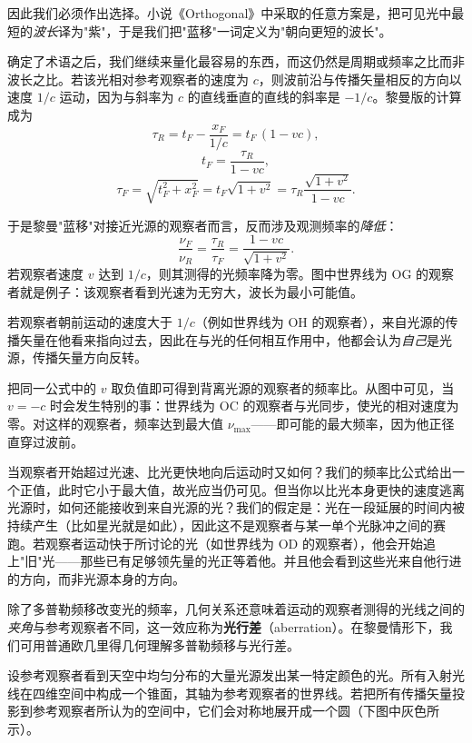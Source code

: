 因此我们必须作出选择。小说《Orthogonal》中采取的任意方案是，把可见光中最短的\emph{波长}译为"紫"，于是我们把"蓝移"一词定义为"朝向更短的波长"。

确定了术语之后，我们继续来量化最容易的东西，而这仍然是周期或频率之比而非波长之比。若该光相对参考观察者的速度为 $c$，则波前沿与传播矢量相反的方向以速度 $1/c$ 运动，因为与斜率为 $c$ 的直线垂直的直线的斜率是 $-1/c$。黎曼版的计算成为
\[
\tau_R = t_F - \frac{x_F}{1/c} = t_F\,(1 - vc),
\]
\[
t_F = \frac{\tau_R}{1 - vc},
\]
\[
\tau_F = \sqrt{t_F^{2} + x_F^{2}}
       = t_F\sqrt{1 + v^{2}}
       = \tau_R\frac{\sqrt{1 + v^{2}}}{1 - vc}.
\]


于是黎曼"蓝移"对接近光源的观察者而言，反而涉及观测频率的\emph{降低}：
\[
\frac{\nu_F}{\nu_R} = \frac{\tau_R}{\tau_F} = \frac{1 - vc}{\sqrt{1 + v^{2}}}.
\]
若观察者速度 $v$ 达到 $1/c$，则其测得的光频率降为零。图中世界线为 OG 的观察者就是例子：该观察者看到光速为无穷大，波长为最小可能值。

若观察者朝前运动的速度大于 $1/c$（例如世界线为 OH 的观察者），来自光源的传播矢量在他看来指向过去，因此在与光的任何相互作用中，他都会认为\emph{自己}是光源，传播矢量方向反转。

把同一公式中的 $v$ 取负值即可得到背离光源的观察者的频率比。从图中可见，当 $v = -c$ 时会发生特别的事：世界线为 OC 的观察者与光同步，使光的相对速度为零。对这样的观察者，频率达到最大值 $\nu_{\max}$——即可能的最大频率，因为他正径直穿过波前。

当观察者开始超过光速、比光更快地向后运动时又如何？我们的频率比公式给出一个正值，此时它小于最大值，故光应当仍可见。但当你以比光本身更快的速度逃离光源时，如何还能接收到来自光源的光？我们的假定是：光在一段延展的时间内被持续产生（比如星光就是如此），因此这不是观察者与某一单个光脉冲之间的赛跑。若观察者运动快于所讨论的光（如世界线为 OD 的观察者），他会开始追上"旧"光——那些已有足够领先量的光正等着他。并且他会看到这些光来自他行进的方向，而非光源本身的方向。

除了多普勒频移改变光的频率，几何关系还意味着运动的观察者测得的光线之间的\emph{夹角}与参考观察者不同，这一效应称为\textbf{光行差}（aberration）。在黎曼情形下，我们可用普通欧几里得几何理解多普勒频移与光行差。

设参考观察者看到天空中均匀分布的大量光源发出某一特定颜色的光。所有入射光线在四维空间中构成一个锥面，其轴为参考观察者的世界线。若把所有传播矢量投影到参考观察者所认为的空间中，它们会对称地展开成一个圆（下图中灰色所示）。

